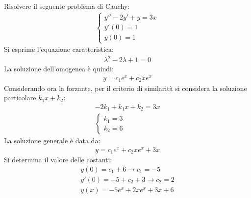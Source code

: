 \documentclass{article}
\numberwithin{equation}{subsection}
\begin{document}
Risolvere il seguente problema di Cauchy:
\begin{gather*}
    \begin{cases}
        y''-2y'+y=3x\\
        y'(0)=1\\
        y(0)=1
    \end{cases}
\end{gather*}
Si esprime l'equazione caratteristica:
\begin{gather*}
    \lambda^2-2\lambda+1=0
\end{gather*}
La soluzione dell'omogenea è quindi:
\begin{gather*}
    y=c_1e^{x}+c_2xe^x
\end{gather*}
Considerando ora la forzante, per il criterio di similarità si considera la soluzione particolare $k_1x+k_2$:
\begin{gather*}
    -2k_1+k_1x+k_2=3x\\
    \begin{cases}
        k_1=3\\
        k_2=6
    \end{cases}
\end{gather*}
La soluzione generale è data da:
\begin{gather*}
    y=c_1e^{x}+c_2xe^x+3x
\end{gather*}
Si determina il valore delle costanti:
\begin{gather*}
    y(0)=c_1+6\to c_1=-5\\
    y'(0)=-5+c_2+3\to c_2=2\\
    y(x)=-5e^x+2xe^x+3x+6
\end{gather*}
\end{document}
